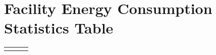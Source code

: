 \section{Facility Energy Consumption Statistics Table}

\DTLsetseparator{///}

\begin{table}[htbp]
\centering
\begin{tabular}
 

 \renewcommand{\dtlheaderformat}{ \rowcolor{lhitabletitle}\color{white}\normalfont\Large\bfseries}
 
\end{tabular}
\end{table}

\begin{table}[htbp]
\centering
\begin{tabular}{llc}
\renewcommand{\dtlheaderformat}{ \rowcolor{lhitabletitle}\color{white}\normalfont\Large\bfseries} }
\rowcolors{2}{lhitabledeep}{lhitablelight}


\DTLdisplaydb{table2}
\end{tabular}
\end{table}

%
%
%
%
%
%
%
%
%
%



